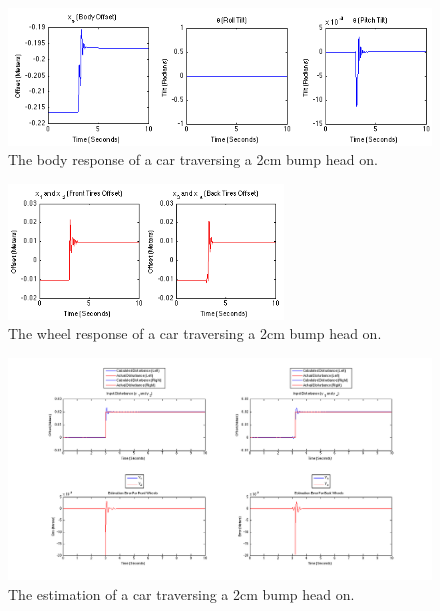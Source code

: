 \begin{figure}[t]
	\centering
	\includegraphics[width=1.0\textwidth]{figures/results_2cm_body.png}
	\caption{The body response of a car traversing a 2cm bump head on.}
	\label{fig:fullcar_2cm_body}
\end{figure}

\begin{figure}[t]
	\centering
	\includegraphics[width=0.65\textwidth]{figures/results_2cm_wheel.png}
	\caption{The wheel response of a car traversing a 2cm bump head on.}
	\label{fig:fullcar_2cm_wheel}
\end{figure}

\begin{figure}[t]
	\centering
	\includegraphics[width=1.0\textwidth]{figures/fullcar_2cm_straight_inverse.png}
	\caption{The estimation of a car traversing a 2cm bump head on.}
	\label{fig:fullcar_2cm}
\end{figure}

